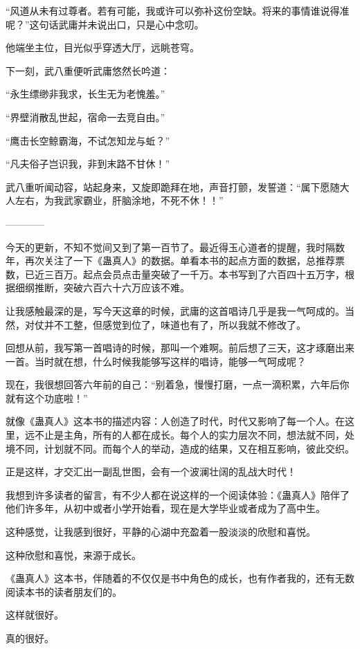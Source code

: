 \begin{this_body}
“风道从未有过尊者。若有可能，我或许可以弥补这份空缺。将来的事情谁说得准呢？”这句话武庸并未说出口，只是心中念叨。

他端坐主位，目光似乎穿透大厅，远眺苍穹。

下一刻，武八重便听武庸悠然长吟道：

“永生缥缈非我求，长生无为老愧羞。”

“界壁消散乱世起，宿命一去竞自由。”

“鹰击长空鲸霸海，不试怎知龙与蚯？”

“凡夫俗子岂识我，非到末路不甘休！”

武八重听闻动容，站起身来，又旋即跪拜在地，声音打颤，发誓道：“属下愿随大人左右，为我武家霸业，肝脑涂地，不死不休！！”

------------

\end{this_body}


\begin{this_body} %

今天的更新，不知不觉间又到了第一百节了。最近得玉心道者的提醒，我时隔数年，再次关注了一下《蛊真人》的数据。单看本书的起点方面的数据，总推荐票数，已近三百万。起点会员点击量突破了一千万。本书写到了六百四十五万字，根据细纲推断，突破六百六十六万应该不难。

让我感触最深的是，写今天这章的时候，武庸的这首唱诗几乎是我一气呵成的。当然，对仗并不工整，但感觉到位了，味道也有了，所以我就不修改了。

回想从前，我写第一首唱诗的时候，那叫一个难啊。前后想了三天，这才琢磨出来一首。当时就在想，什么时候我能够写这样的唱诗，能够一气呵成呢？

现在，我很想回答六年前的自己：“别着急，慢慢打磨，一点一滴积累，六年后你就有这个功底啦！”

就像《蛊真人》这本书的描述内容：人创造了时代，时代又影响了每一个人。在这里，远不止是主角，所有的人都在成长。每个人的实力层次不同，想法就不同，处境不同，计划就不同。而每个人的举动，造成的结果，又在相互影响，彼此交织。

正是这样，才交汇出一副乱世图，会有一个波澜壮阔的乱战大时代！

我想到许多读者的留言，有不少人都在说这样的一个阅读体验：《蛊真人》陪伴了他们许多年，从初中或者小学开始看，现在是大学毕业或者成为了高中生。

这种感觉，让我感到很好，平静的心湖中充盈着一股淡淡的欣慰和喜悦。

这种欣慰和喜悦，来源于成长。

《蛊真人》这本书，伴随着的不仅仅是书中角色的成长，也有作者我的，还有无数阅读本书的读者朋友们的。

这样就很好。

真的很好。

\end{this_body}

